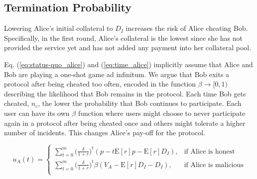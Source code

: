 \documentclass[runningheads]{llncs}
\newcommand{\dom}[1]{\todo[linecolor=green,backgroundcolor=green!25,bordercolor=green,inline,caption={}]{Comment by Dominik: #1}}
\begin{document}
\subsection{Termination Probability}
Lowering Alice's initial collateral to $D_I$ increases the risk of Alice cheating Bob.
Specifically, in the first round, Alice's collateral is the lowest since she has not provided the service yet and has not added any payment into her collateral pool.

Eq. (\ref{eq:status-quo_alice}) and (\ref{eq:time_alice}) implicitly assume that Alice and Bob are playing a one-shot game ad infinitum.
We argue that Bob exits a protocol after being cheated too often, encoded in the function $\beta \to [0,1)$ describing the likelihood that Bob remains in the protocol.
Each time Bob gets cheated, $n_c$, the lower the probability that Bob continues to participate.
Each user can have its own $\beta$ function where users might choose to never participate again in a protocol after being cheated once and others might tolerate a higher number of incidents.
This changes Alice's pay-off for the protocol.

\begin{equation}
\label{eq:promise_alice}
u_A(t) = 
\begin{cases}
    \sum_{t=0}^{m} \big( \frac{\delta}{1+r} \big)^{t} ( p - t\mathrm{E}[r]p -\mathrm{E}[r]D_{I}), & \text{if Alice is honest} \\
    \sum_{t=0}^{m} \big( \frac{\delta}{1+r} \big)^{t} \beta (V_A - \mathrm{E}[r]D_{I}-D_{I}), & \text{if Alice is malicious} \\
\end{cases}
\end{equation}
\end{document}
